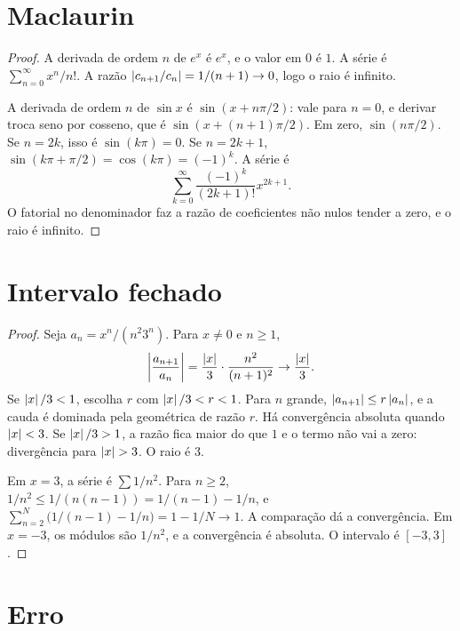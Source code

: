 \documentclass[11pt,a4paper]{article}
\begin{document}
\section{Maclaurin}

\begin{proof}
A derivada de ordem \(n\) de \(e^x\) é \(e^x\), e o valor em \(0\) é \(1\). A série é \(\sum_{n=0}^\infty x^n/n!\). A razão \(\left\lvert c_{n+1}/c_n \right\rvert=1/(n+1)\to 0\), logo o raio é infinito.

A derivada de ordem \(n\) de \(\sin x\) é \(\sin(x+n\pi/2)\): vale para \(n=0\), e derivar troca seno por cosseno, que é \(\sin(x+(n+1)\pi/2)\). Em zero, \(\sin(n\pi/2)\). Se \(n=2k\), isso é \(\sin(k\pi)=0\). Se \(n=2k+1\), \(\sin(k\pi+\pi/2)=\cos(k\pi)=(-1)^k\). A série é
\[
\sum_{k=0}^\infty\frac{(-1)^k}{(2k+1)!}x^{2k+1}.
\]
O fatorial no denominador faz a razão de coeficientes não nulos tender a zero, e o raio é infinito.
\end{proof}

\section{Intervalo fechado}

\begin{proof}
Seja \(a_n=x^n/(n^2 3^n)\). Para \(x\neq 0\) e \(n\ge 1\),
\[
\left\lvert \frac{a_{n+1}}{a_n} \right\rvert
=\frac{\left\lvert x \right\rvert}{3}\cdot\frac{n^2}{(n+1)^2}\to\frac{\left\lvert x \right\rvert}{3}.
\]
Se \(\left\lvert x \right\rvert/3<1\), escolha \(r\) com \(\left\lvert x \right\rvert/3<r<1\). Para \(n\) grande, \(\left\lvert a_{n+1} \right\rvert\le r\left\lvert a_n \right\rvert\), e a cauda é dominada pela geométrica de razão \(r\). Há convergência absoluta quando \(\left\lvert x \right\rvert<3\). Se \(\left\lvert x \right\rvert/3>1\), a razão fica maior do que \(1\) e o termo não vai a zero: divergência para \(\left\lvert x \right\rvert>3\). O raio é \(3\).

Em \(x=3\), a série é \(\sum 1/n^2\). Para \(n\ge 2\), \(1/n^2\le 1/(n(n-1))=1/(n-1)-1/n\), e \(\sum_{n=2}^N\bigl(1/(n-1)-1/n\bigr)=1-1/N\to 1\). A comparação dá a convergência. Em \(x=-3\), os módulos são \(1/n^2\), e a convergência é absoluta. O intervalo é \([-3,3]\).
\end{proof}

\section{Erro}
\end{document}
